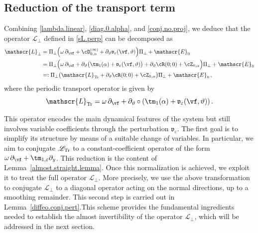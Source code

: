 \documentclass[a4paper,reqno,10pt]{article}
\newcommand{\pa}{\partial}
\newcommand{\sL}{\mathscr{L}}
\newcommand{\sE}{\mathscr{E}}
\newcommand{\fv}{\mathfrak{v}}
\begin{document}
\subsection{Reduction of the transport term}\label{sect.redu.eps}
Combining \eqref{lambda.linear}, \eqref{diag.0.alpha}, and \eqref{conj.no.proj}, we deduce that the operator $\sL_{\perp}$ defined in \eqref{sL.perp} can be decomposed as
\begin{align}\label{sL.perp.intro}
	\sL_{\perp} & =  \Pi_{\perp} \Big(  \omega\,\pa_{\vf}  + \cD_{0,\alpha}^{(\infty)}+\pa_{\vartheta} \fv_{\varepsilon}(\vf,\vartheta) \Big) \Pi_{\perp} +\sE_{0} \\ 
	& =  \Pi_{\perp} \Big(  \omega\,\pa_{\vf} + \pa_{\vartheta}\big( \tm_{1}(\alpha) + \fv_{\varepsilon}(\vf,\vartheta)  \big) + \pa_{\vartheta} \cR(0;0) + \cZ_{0,\alpha} \Big) \Pi_{\perp} +\sE_{0} \\
	& = : \Pi_{\perp} \big( \sL_{\rm Tr}+ \pa_{\vartheta} \cR(0;0) + \cZ_{0,\alpha} \big)  \Pi_{\perp} +\sE_{0} \,,
\end{align}
where the periodic transport operator is given by
\begin{equation}\label{transport.op}
	\sL_{\rm Tr} = \omega\,\pa_{\vf} + \pa_{\vartheta}\circ(\tm_{1}(\alpha) + \fv_{\varepsilon}(\vf,\vartheta)) \,.
\end{equation}

This operator encodes the main dynamical features of the system but still involves variable coefficients through the perturbation $\fv_{\varepsilon}$.
The first goal is to simplify its structure by means of a suitable change of variables. In particular, we aim to conjugate $\sL_{\rm Tr}$ to a constant-coefficient operator of the form $\omega\,\pa_{\vf} + \tm_{1,\varepsilon}\pa_{y}$. This reduction is the content of Lemma~\ref{almost.straight.lemma}.
Once this normalization is achieved, we exploit it to treat the full operator $\sL_{\perp}$. More precisely, we use the above transformation to conjugate $\sL_{\perp}$ to a diagonal operator acting on the normal directions, up to a smoothing remainder. This second step is carried out in Lemma~\ref{diffeo.conj.pert}.This scheme provides the fundamental ingredients needed to establish the almost invertibility of the operator $\sL_{\perp}$, which will be addressed in the next section.

\medskip
\end{document}
